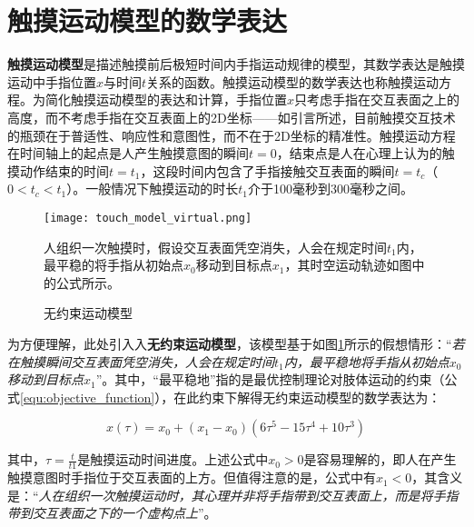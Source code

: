 
\section{触摸运动模型的数学表达}

\textbf{触摸运动模型}是描述触摸前后极短时间内手指运动规律的模型，其数学表达是触摸运动中手指位置$x$与时间$t$关系的函数。触摸运动模型的数学表达也称触摸运动方程。为简化触摸运动模型的表达和计算，手指位置$x$只考虑手指在交互表面之上的高度，而不考虑手指在交互表面上的2D坐标——如引言所述，目前触摸交互技术的瓶颈在于普适性、响应性和意图性，而不在于2D坐标的精准性。触摸运动方程在时间轴上的起点是人产生触摸意图的瞬间$t=0$，结束点是人在心理上认为的触摸动作结束的时间$t=t_1$，这段时间内包含了手指接触交互表面的瞬间$t=t_c$（$0<t_c<t_1$）。一般情况下触摸运动的时长$t_1$介于100毫秒到300毫秒之间。


\begin{figure}
	\centering
	\texttt{[image: touch\_model\_virtual.png]}
	\caption*{人组织一次触摸时，假设交互表面凭空消失，人会在规定时间$t_1$内，最平稳的将手指从初始点$x_0$移动到目标点$x_1$，其时空运动轨迹如图中的公式所示。}
	\caption{无约束运动模型}
	\label{fig:touch_model_virtual}
\end{figure}


为方便理解，此处引入入\textbf{无约束运动模型}，该模型基于如图\ref{fig:touch_model_virtual}所示的假想情形：“\emph{若在触摸瞬间交互表面凭空消失，人会在规定时间$t_1$内，最平稳地将手指从初始点$x_0$移动到目标点$x_1$}”。其中，“最平稳地”指的是最优控制理论对肢体运动的约束（公式\ref{equ:objective_function}），在此约束下解得无约束运动模型的数学表达为：

\begin{equation}
	x(\tau)=x_0+(x_1-x_0)(6\tau^5-15\tau^4+10\tau^3)
	\label{equ:touch_model_unconstrained}
\end{equation}

其中，$\tau=\frac{t}{t1}$是触摸运动时间进度。上述公式中$x_0>0$是容易理解的，即人在产生触摸意图时手指位于交互表面的上方。但值得注意的是，公式中有$x_1<0$，其含义是：“\emph{人在组织一次触摸运动时，其心理并非将手指带到交互表面上，而是将手指带到交互表面之下的一个虚构点上}”。


